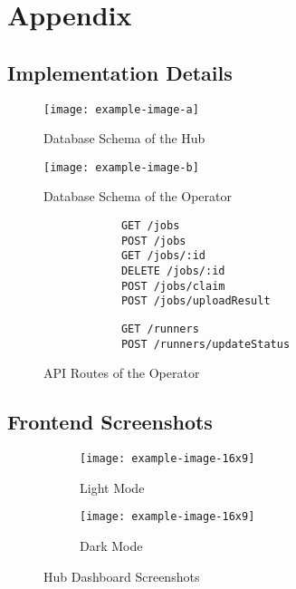 \documentclass[../paper.tex]{subfiles}
\begin{document}
    \appendix
    \section{Appendix}\label{ch:appendix}
    \subsection{Implementation Details}
    \begin{figure}[H]%
        \centering%
        \texttt{[image: example-image-a]}%
        \caption{Database Schema of the Hub}%
        \label{fig:hub-uml}%
    \end{figure}
    \begin{figure}[H]%
        \centering%
        \texttt{[image: example-image-b]}%
        \caption{Database Schema of the Operator}%
        \label{fig:operator-uml}%
    \end{figure}
    \begin{figure}[ht!]
        \centering
        \begin{verbatim}
            GET /jobs
            POST /jobs
            GET /jobs/:id
            DELETE /jobs/:id
            POST /jobs/claim
            POST /jobs/uploadResult
        \end{verbatim}
        \begin{verbatim}
            GET /runners
            POST /runners/updateStatus
        \end{verbatim}
        \caption{API Routes of the Operator}
        \label{fig:operator-api}
    \end{figure}
    \subsection{Frontend Screenshots}
    \begin{figure}[H]%
        \begin{subfigure}[t]{.5\columnwidth}
            \centering%
            \texttt{[image: example-image-16x9]}%
            \caption{Light Mode}%
            \label{fig:hub-dashboard-light}%
        \end{subfigure}%
        \begin{subfigure}[t]{.5\columnwidth}
            \centering%
            \texttt{[image: example-image-16x9]}%
            \caption{Dark Mode}%
            \label{fig:hub-dashboard-dark}%
        \end{subfigure}%
        \caption{Hub Dashboard Screenshots}%
        \label{fig:hub-dashboard}%
    \end{figure}

\end{document}
